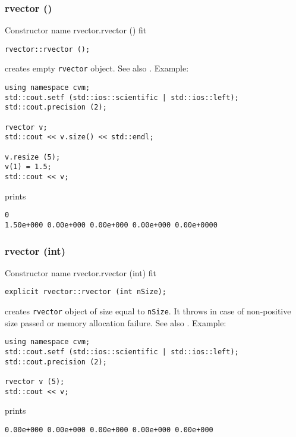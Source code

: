 \subsubsection{rvector ()}
Constructor%
\pdfdest name {rvector.rvector ()} fit
\begin{verbatim}
rvector::rvector ();
\end{verbatim}
creates  empty \verb"rvector" object.
See also .
Example:
\begin{Verbatim}
using namespace cvm;
std::cout.setf (std::ios::scientific | std::ios::left); 
std::cout.precision (2);

rvector v;
std::cout << v.size() << std::endl;

v.resize (5);
v(1) = 1.5;
std::cout << v;
\end{Verbatim}
prints
\begin{Verbatim}
0
1.50e+000 0.00e+000 0.00e+000 0.00e+000 0.00e+0000
\end{Verbatim}
\newpage


\subsubsection{rvector (int)}
Constructor%
\pdfdest name {rvector.rvector (int)} fit
\begin{verbatim}
explicit rvector::rvector (int nSize);
\end{verbatim}
creates \verb"rvector" object of size equal to \verb"nSize".
It throws  
in case of non-positive size passed or memory allocation failure.
See also .
Example:
\begin{Verbatim}
using namespace cvm;
std::cout.setf (std::ios::scientific | std::ios::left); 
std::cout.precision (2);

rvector v (5);
std::cout << v;
\end{Verbatim}
prints
\begin{Verbatim}
0.00e+000 0.00e+000 0.00e+000 0.00e+000 0.00e+000
\end{Verbatim}
\newpage



